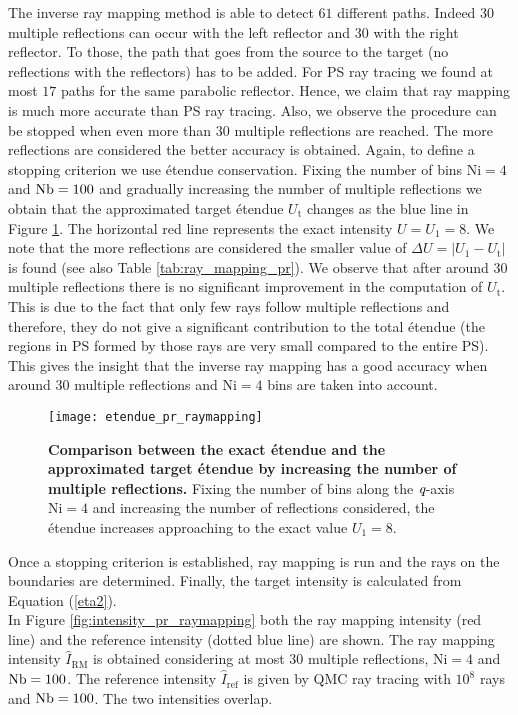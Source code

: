 The inverse ray mapping method is able to detect $61$ different paths. Indeed $30$ multiple reflections can occur with the left reflector and $30$ with the right reflector. To those, the path that goes from the source to the target (no reflections with the reflectors) has to be added. For PS ray tracing we found at most $17$ paths for the same parabolic reflector. Hence, we claim that ray mapping is much more accurate than PS ray tracing. Also, we observe the procedure can be stopped when even more than $30$ multiple reflections are reached. The more reflections are considered the better accuracy is obtained. Again, to define a stopping criterion we use \'{e}tendue conservation. Fixing the number of bins $\textrm{Ni}=4$ and $\textrm{Nb}=100$ and gradually increasing the number of multiple reflections we obtain that the approximated target \'{e}tendue $U_{\textrm{t}}$ changes as the blue line in Figure \ref{fig:etendue_pr_raymapping}. The horizontal red line represents the exact intensity $U = U_{1} = 8$. We note that the more reflections are considered the smaller value of $\Delta U = |U_1-U_{\textrm{t}}|$ is found (see also Table \ref{tab:ray_mapping_pr}). We observe that after around $30$ multiple reflections there is no significant improvement in the computation of $U_{\textrm{t}}$. This is due to the fact that only few rays follow multiple reflections and therefore, they do not give a significant contribution to the total \'{e}tendue (the regions in PS formed by those rays are very small compared to the entire PS). This gives the insight that the inverse ray mapping has a good accuracy when around $30$ multiple reflections and $\textrm{Ni}=4$ bins are taken into account.
\begin{figure}[h]
  \begin{center}
  \texttt{[image: etendue\_pr\_raymapping]}
  \end{center}
  \caption{\textbf{Comparison between the exact \'{e}tendue and the approximated target \'{e}tendue by increasing the number of multiple reflections.}
Fixing the number of bins along the $\textit{q}$-axis $\textrm{Ni}=4$ and increasing the number of reflections considered, the \'{e}tendue increases approaching to the exact value $U_1=8$.}
\label{fig:etendue_pr_raymapping}
 \end{figure}
Once a stopping criterion is established, ray mapping is run and the rays on the boundaries are determined. Finally, the target intensity is calculated from Equation (\ref{eta2}). 
\\ \indent In Figure \ref{fig:intensity_pr_raymapping} both the ray mapping intensity (red line) and the reference intensity (dotted blue line) are shown. The ray mapping intensity $\hat{I}_{\textrm{RM}}$ is obtained considering at most $30$ multiple reflections, $\textrm{Ni}=4$ and $\textrm{Nb} = 100$. The reference intensity $\hat{I}_{\textrm{ref}}$ is given by QMC ray tracing with $10^8$ rays and $\textrm{Nb} = 100$. The two intensities overlap.
